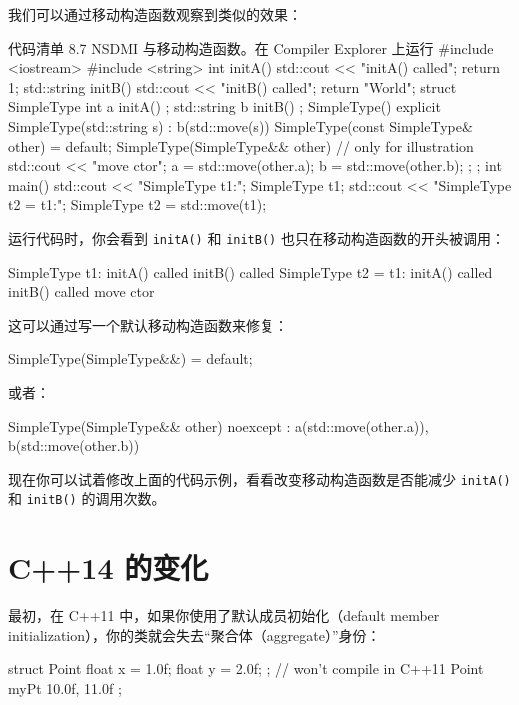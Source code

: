 我们可以通过移动构造函数观察到类似的效果：

\begin{codeboxt}[cpp]{代码清单 8.7 NSDMI 与移动构造函数。在 Compiler Explorer 上运行}
#include <iostream>
#include <string>
int initA() {
    std::cout << "initA() called\n";
    return 1;
}
std::string initB() {
    std::cout << "initB() called\n";
    return "World";
}
struct SimpleType {
    int a { initA() };
    std::string b { initB() };
    SimpleType() { }
    explicit SimpleType(std::string s) : b(std::move(s)) { }
    SimpleType(const SimpleType& other) = default;
    SimpleType(SimpleType&& other) { // only for illustration
        std::cout << "move ctor\n";
        a = std::move(other.a);
        b = std::move(other.b);
    };
};
int main() {
    std::cout << "SimpleType t1:\n";
    SimpleType t1;
    std::cout << "SimpleType t2 = t1:\n";
    SimpleType t2 = std::move(t1);
}
\end{codeboxt}

运行代码时，你会看到 \texttt{initA()} 和 \texttt{initB()} 也只在移动构造函数的开头被调用：

\begin{codebox}[cpp]
SimpleType t1:
initA() called
initB() called
SimpleType t2 = t1:
initA() called
initB() called
move ctor
\end{codebox}

这可以通过写一个默认移动构造函数来修复：

\begin{codebox}[cpp]
SimpleType(SimpleType&&) = default;
\end{codebox}

或者：

\begin{codebox}[cpp]
SimpleType(SimpleType&& other) noexcept
: a(std::move(other.a)), b(std::move(other.b)) { }
\end{codebox}

现在你可以试着修改上面的代码示例，看看改变移动构造函数是否能减少 \texttt{initA()} 和 \texttt{initB()} 的调用次数。

\section{C++14 的变化}

最初，在 C++11 中，如果你使用了默认成员初始化（default member initialization），你的类就会失去“聚合体（aggregate）”身份：

\begin{codebox}[cpp]
struct Point { float x = 1.0f; float y = 2.0f; };
// won't compile in C++11
Point myPt { 10.0f, 11.0f };
\end{codebox}

